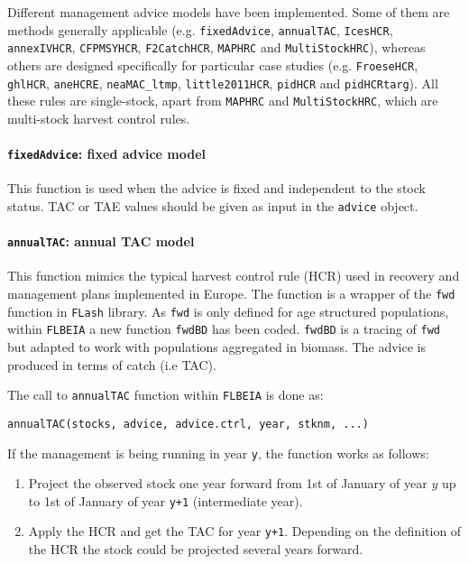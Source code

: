 Different management advice models have been implemented. Some of them are methods generally applicable 
(e.g. \texttt{fixedAdvice}, \texttt{annualTAC}, \texttt{IcesHCR}, \texttt{annexIVHCR}, \texttt{CFPMSYHCR}, \texttt{F2CatchHCR}, \texttt{MAPHRC} and \texttt{MultiStockHRC}), 
whereas others are designed specifically for particular case studies (e.g. \texttt{FroeseHCR}, \texttt{ghlHCR}, \texttt{aneHCRE}, \texttt{neaMAC\_ltmp}, \texttt{little2011HCR}, \texttt{pidHCR} and \texttt{pidHCRtarg}). All these rules are single-stock, apart from \texttt{MAPHRC} and \texttt{MultiStockHRC}, which are multi-stock harvest control rules.

\paragraph{\texttt{fixedAdvice}: fixed advice model} \hspace{0pt} \smallskip

  This function is used when the advice is fixed and independent to the stock status. 
  TAC or TAE values should be given as input in the \texttt{advice} object.

\paragraph{\texttt{annualTAC}: annual TAC model} \hspace{0pt} \smallskip

	This function mimics the typical harvest control rule (HCR) used in recovery and management plans implemented in Europe.
	The function is a wrapper of the \texttt{fwd} function in \texttt{FLash} library.
	As \texttt{fwd} is only defined for age structured populations, within \texttt{FLBEIA} a new
	function \texttt{fwdBD} has been coded. \texttt{fwdBD} is a tracing of \texttt{fwd} but adapted to work with 
	populations aggregated in biomass. The advice is produced in terms of catch (i.e TAC). 
	
	The call to \texttt{annualTAC} function within \texttt{FLBEIA} is done as:
	
	\begin{center}
		\texttt{annualTAC(stocks, advice, advice.ctrl, year, stknm, ...)} 
	\end{center}

	If the management is being running in year \texttt{y}, the function works as follows:
	\begin{enumerate}
		\item Project the observed stock one year forward from 1st of January of year $y$ up 
			to 1st of January of year \texttt{y+1} (intermediate year).
		\item Apply the HCR and get the TAC for year \texttt{y+1}. Depending on the definition of the HCR the stock could be 
			projected several years forward. 
	\end{enumerate}


